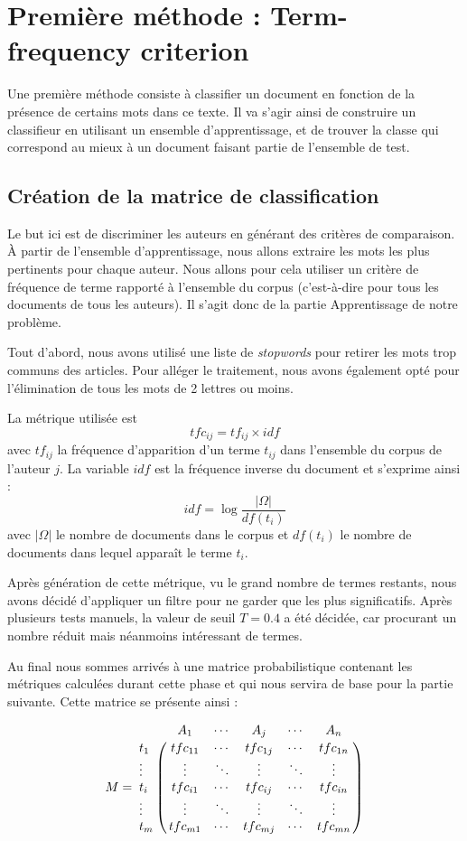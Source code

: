 \documentclass[a4paper,12pt]{report}
\begin{document}
\section{Première méthode : Term-frequency criterion}
Une première méthode consiste à classifier un document en fonction de la présence de certains mots dans ce texte. Il va s'agir ainsi de construire un classifieur en utilisant un ensemble d'apprentissage, et de trouver la classe qui correspond au mieux à un document faisant partie de l'ensemble de test.

\subsection{Création de la matrice de classification}
Le but ici est de discriminer les auteurs en générant des critères de comparaison. À partir de l'ensemble d'apprentissage, nous allons extraire les mots les plus pertinents pour chaque auteur. Nous allons pour cela utiliser un critère de fréquence de terme rapporté à l'ensemble du corpus (c'est-à-dire pour tous les documents de tous les auteurs). Il s'agit donc de la partie Apprentissage de notre problème.

Tout d'abord, nous avons utilisé une liste de \textit{stopwords} pour retirer les mots trop communs des articles. Pour alléger le traitement, nous avons également opté pour l'élimination de tous les mots de 2 lettres ou moins. 

La métrique utilisée est \[ tfc_{ij} = tf_{ij} \times idf\] avec $tf_{ij}$ la fréquence d'apparition d'un terme $t_{ij}$ dans l'ensemble du corpus de l'auteur $j$.  La variable $idf$ est la fréquence inverse du document et s'exprime ainsi : \[idf = \log \frac{|\Omega|}{df(t_{i})} \] avec $|\Omega|$ le nombre de documents dans le corpus et $df(t_{i})$ le nombre de documents dans lequel apparaît le terme $t_{i}$.

Après génération de cette métrique, vu le grand nombre de termes restants, nous avons décidé d'appliquer un filtre pour ne garder que les plus significatifs. Après plusieurs tests manuels, la valeur de seuil $T = 0.4 $ a été décidée, car procurant un nombre réduit mais néanmoins intéressant de termes.

Au final nous sommes arrivés à une matrice probabilistique contenant les métriques calculées durant cette phase et qui nous servira de base pour la partie suivante. Cette matrice se présente ainsi :

\[M=\bordermatrix{
&A_{1}&\cdots&A_{j}&\cdots&A_{n}\cr
t_{1}& tfc_{11} & \cdots & tfc_{1j} & \cdots & tfc_{1n} \cr
\vdots&\vdots&\ddots&\vdots&\ddots&\vdots\cr
t_{i}& tfc_{i1} & \cdots & tfc_{ij} & \cdots & tfc_{in} \cr
\vdots&\vdots&\ddots&\vdots&\ddots&\vdots\cr
t_{m}& tfc_{m1} & \cdots & tfc_{mj} & \cdots & tfc_{mn} \cr
}\]
\end{document}
